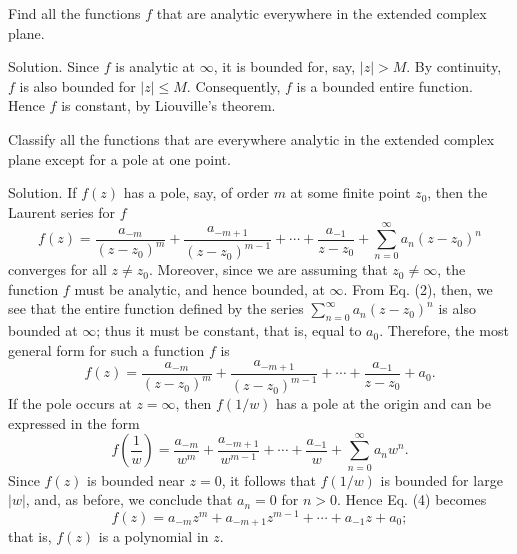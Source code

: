 \begin{example}
Find all the functions $f$ that are analytic everywhere in the extended complex plane.

Solution. Since $f$ is analytic at $\infty$, it is bounded for, say, $|z|>M$. By continuity, $f$ is also bounded for $|z| \leq M$. Consequently, $f$ is a bounded entire function. Hence $f$ is constant, by Liouville's theorem.
\end{example}
\begin{example}
Classify all the functions that are everywhere analytic in the extended complex plane except for a pole at one point.

Solution. If $f(z)$ has a pole, say, of order $m$ at some finite point $z_0$, then the Laurent series for $f$
\[
f(z)=\frac{a_{-m}}{\left(z-z_0\right)^m}+\frac{a_{-m+1}}{\left(z-z_0\right)^{m-1}}+\cdots+\frac{a_{-1}}{z-z_0}+\sum_{n=0}^{\infty} a_n\left(z-z_0\right)^n
\]
converges for all $z \neq z_0$. Moreover, since we are assuming that $z_0 \neq \infty$, the function $f$ must be analytic, and hence bounded, at $\infty$. From Eq. (2), then, we see that the entire function defined by the series $\sum_{n=0}^{\infty} a_n\left(z-z_0\right)^n$ is also bounded at $\infty$; thus it must be constant, that is, equal to $a_0$. Therefore, the most general form for such a function $f$ is
\[
f(z)=\frac{a_{-m}}{\left(z-z_0\right)^m}+\frac{a_{-m+1}}{\left(z-z_0\right)^{m-1}}+\cdots+\frac{a_{-1}}{z-z_0}+a_0 .
\]
If the pole occurs at $z=\infty$, then $f(1 / w)$ has a pole at the origin and can be expressed in the form
\[
f\left(\frac{1}{w}\right)=\frac{a_{-m}}{w^m}+\frac{a_{-m+1}}{w^{m-1}}+\cdots+\frac{a_{-1}}{w}+\sum_{n=0}^{\infty} a_n w^n .
\]
Since $f(z)$ is bounded near $z=0$, it follows that $f(1 / w)$ is bounded for large $|w|$, and, as before, we conclude that $a_n=0$ for $n>0$. Hence Eq. (4) becomes
\[
f(z)=a_{-m} z^m+a_{-m+1} z^{m-1}+\cdots+a_{-1} z+a_0 ;
\]
that is, $f(z)$ is a polynomial in $z$.
\end{example}


